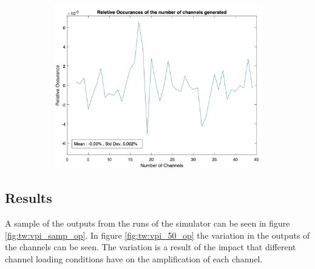 \begin{figure}
\begin{subfigure}{0.49\textwidth}
        \includegraphics[width=\textwidth]{images/technical_work/section_2_data generation/rel_occur_num_ch.png}
        \label{fig:tw:data_gen:rel_num_ch}
    \end{subfigure}
\end{figure}


\FloatBarrier

\subsection{Results}

A sample of the outputs from the runs of the simulator can be seen in figure \ref{fig:tw:vpi_samp_op}. In figure \ref{fig:tw:vpi_50_op} the variation in the outputs of the channels can be seen. The variation is a result of the impact that different channel loading conditions have on the amplification of each channel.

